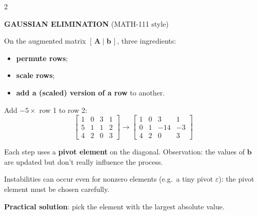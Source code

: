 \documentclass[a4paper,9pt]{extarticle}
\begin{document}
\begin{multicols}{2}
\begin{definition}

\textbf{GAUSSIAN ELIMINATION} (MATH-111 style)

On the augmented matrix $[\,\mathbf{A} \mid \mathbf{b}\,]$, three ingredients:

\begin{itemize}

\item \textbf{permute rows};

\item \textbf{scale rows};

\item \textbf{add a (scaled) version of a row} to another.

\end{itemize}

\end{definition}


\begin{example}

Add $-5\times$ row 1 to row 2:
\[
\left[\begin{array}{ccc|c} 1 & 0 & 3 & 1 \\ 5 & 1 & 1 & 2 \\ 4 & 2 & 0 & 3 \end{array}\right]
\rightarrow
\left[\begin{array}{ccc|c} 1 & 0 & 3 & 1 \\ 0 & 1 & -14 & -3 \\ 4 & 2 & 0 & 3 \end{array}\right]
\]

\end{example}


\begin{important}

Each step uses a \textbf{pivot element} on the diagonal. Observation: the values of $\mathbf{b}$
are updated but don't really influence the process.

\end{important}


\begin{warning}

Instabilities can occur even for nonzero elements (e.g.\ a tiny pivot $\varepsilon$): the pivot
element must be chosen carefully.

\textbf{Practical solution}: pick the element with the largest absolute value.

\end{warning}




\end{multicols}
\end{document}
